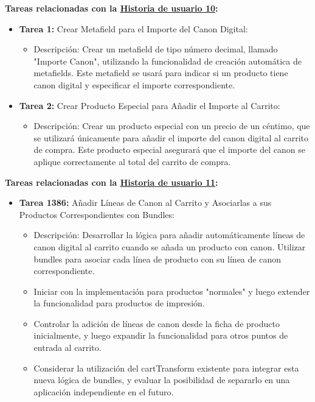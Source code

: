 \documentclass[12pt]{article}
\begin{document}
\textbf{Tareas relacionadas con la \hyperref[sec:historia10]{Historia de usuario 10}:}
\begin{itemize}
    \item \textbf{Tarea 1:} Crear Metafield para el Importe del Canon Digital:
          \begin{itemize}[label=--]
              \item Descripción: Crear un metafield de tipo número decimal, llamado "Importe Canon", utilizando la funcionalidad de creación automática de metafields. Este metafield se usará para indicar si un producto tiene canon digital y especificar el importe correspondiente.
          \end{itemize}
    \item \textbf{Tarea 2:} Crear Producto Especial para Añadir el Importe al Carrito:
          \begin{itemize}[label=--]
              \item Descripción: Crear un producto especial con un precio de un céntimo, que se utilizará únicamente para añadir el importe del canon digital al carrito de compra. Este producto especial asegurará que el importe del canon se aplique correctamente al total del carrito de compra.
          \end{itemize}
\end{itemize}

\textbf{Tareas relacionadas con la \hyperref[sec:historia11]{Historia de usuario 11}:}
\begin{itemize}
    \item \textbf{Tarea 1386:} Añadir Líneas de Canon al Carrito y Asociarlas a sus Productos Correspondientes con Bundles:
          \begin{itemize}[label=--]
              \item Descripción: Desarrollar la lógica para añadir automáticamente líneas de canon digital al carrito cuando se añada un producto con canon. Utilizar bundles para asociar cada línea de producto con su línea de canon correspondiente.
              \item Iniciar con la implementación para productos "normales" y luego extender la funcionalidad para productos de impresión.
              \item Controlar la adición de líneas de canon desde la ficha de producto inicialmente, y luego expandir la funcionalidad para otros puntos de entrada al carrito.
              \item Considerar la utilización del cartTransform existente para integrar esta nueva lógica de bundles, y evaluar la posibilidad de separarlo en una aplicación independiente en el futuro.
          \end{itemize}
\end{itemize}
\end{document}

